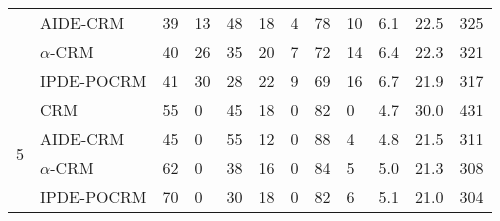 \begin{tabular*}{\textwidth}{@{\extracolsep\fill}clllllllllll@{\extracolsep\fill}}
 & AIDE-CRM & 39 & 13 & 48 & 18 & 4 & 78 & 10 & 6.1 & 22.5 & 325\\
 & $\alpha$-CRM & 40 & 26 & 35 & 20 & 7 & 72 & 14 & 6.4 & 22.3 & 321\\
 & IPDE-POCRM & 41 & 30 & 28 & 22 & 9 & 69 & 16 & 6.7 & 21.9 & 317\\
\midrule
\multirow{4}{2em}{5} & CRM & 55 & 0 & 45 & 18 & 0 & 82 & 0 & 4.7 & 30.0 & 431\\
 & AIDE-CRM & 45 & 0 & 55 & 12 & 0 & 88 & 4 & 4.8 & 21.5 & 311\\
 & $\alpha$-CRM & 62 & 0 & 38 & 16 & 0 & 84 & 5 & 5.0 & 21.3 & 308\\
 & IPDE-POCRM & 70 & 0 & 30 & 18 & 0 & 82 & 6 & 5.1 & 21.0 & 304\\
\bottomrule
\end{tabular*}
